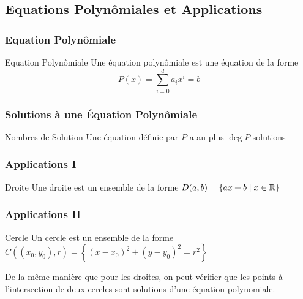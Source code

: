 \documentclass{beamercours}
\begin{document}
\subsection{Equations Polynômiales et Applications}
\begin{frame}
\frametitle{Equation Polynômiale}
\begin{définition}{Equation Polynômiale}{}
Une équation polynômiale est une équation de la forme
\[
    P(x) = \sum_{i = 0}^{d} a_{i}x^{i} = b
\]
\end{définition}
\end{frame}

\begin{frame}
\frametitle{Solutions à une Équation Polynômiale}
\begin{propositionfr}{Nombres de Solution}{}
    Une équation définie par $P$ a au plus $\deg P$ solutions
\end{propositionfr}
\end{frame}

\begin{frame}
\frametitle{Applications I}
\begin{définition}{Droite}{}
Une droite est un ensemble de la forme $D(a, b) = \{ax + b \mid x \in \mathbb{R}\}$
\end{définition}

\end{frame}

\begin{frame}
\frametitle{Applications II}
\begin{définition}{Cercle}{}
Un cercle est un ensemble de la forme $C((x_{0}, y_{0}), r) = \left\{(x - x_{0})^{2} + (y - y_{0})^{2} = r^{2}\right\}$
\end{définition}
De la même manière que pour les droites, on peut vérifier que les points à l'intersection de deux cercles sont solutions d'une équation polynomiale.
\end{frame}
\end{document}
